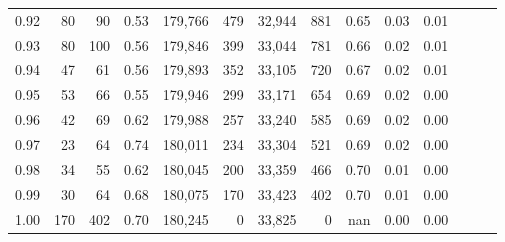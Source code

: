 \begin{tabular}{rrrrrrrrrrrrrr}
0.92 &     80 &   90 &  0.53 &  179,766 &      479 &  32,944 &     881 &  0.65 &  0.03 &      0.01 \\
0.93 &     80 &  100 &  0.56 &  179,846 &      399 &  33,044 &     781 &  0.66 &  0.02 &      0.01 \\
0.94 &     47 &   61 &  0.56 &  179,893 &      352 &  33,105 &     720 &  0.67 &  0.02 &      0.01 \\
0.95 &     53 &   66 &  0.55 &  179,946 &      299 &  33,171 &     654 &  0.69 &  0.02 &      0.00 \\
0.96 &     42 &   69 &  0.62 &  179,988 &      257 &  33,240 &     585 &  0.69 &  0.02 &      0.00 \\
0.97 &     23 &   64 &  0.74 &  180,011 &      234 &  33,304 &     521 &  0.69 &  0.02 &      0.00 \\
0.98 &     34 &   55 &  0.62 &  180,045 &      200 &  33,359 &     466 &  0.70 &  0.01 &      0.00 \\
0.99 &     30 &   64 &  0.68 &  180,075 &      170 &  33,423 &     402 &  0.70 &  0.01 &      0.00 \\
1.00 &    170 &  402 &  0.70 &  180,245 &        0 &  33,825 &       0 &   nan &  0.00 &      0.00 \\
\bottomrule
\end{tabular}
